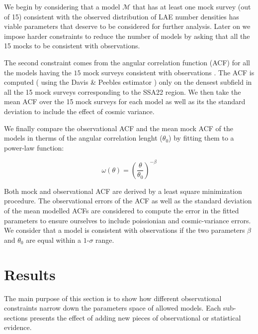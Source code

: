 \documentclass[usenatbib]{mn2e}
\begin{document}
We begin by considering that  a model ${\mathcal M}$ that has at least
one mock survey (out of 15) consistent with the observed
distribution of LAE number densities has viable parameters that
deserve to be considered for further analysis. Later on we impose
harder constraints to reduce the number of models by asking that all
the 15 mocks to be consistent with observations.

The second constraint  comes from the angular correlation function (ACF)
for all the models having the $15$ mock surveys consistent with
observations . The ACF is computed  ( using 
the Davis \& Peebles  estimator \citep{Davis1983} ) only on the densest
subfield in all the 15 mock surveys corresponding to the SSA22
region. We then take the mean ACF over the 15  mock surveys  for
each model as well as its the standard deviation to include
the effect of cosmic variance. 

We finally compare the observational ACF and the mean mock  ACF of the models   
in therms of the angular correlation lenght ($\theta_{0}$) by fitting 
them to a power-law function:  

\begin{equation}
\omega(\theta) = \left(\frac{\theta}{\theta_{0}}\right)^{-\beta}
\label{eq:fitting}
\end{equation}

Both mock and observational ACF are derived by a least
square minimization procedure. The observational errors of 
the ACF as well as the standard deviation of the mean modelled ACFs  are
considered to compute the error in the fitted parameters to ensure ourselves
to include poissionian and cosmic-variance errors. 
We consider that a model is consistent with observations if the two
parameters $\beta$ and $\theta_0$ are equal within a $1$-$\sigma$ range. 



 
\section{Results}
\label{sec:results}

The main purpose of this section is to show how different
observational constraints narrow down the parameters space of allowed
models. Each sub-sections presents the effect of adding new pieces of
observational or statistical evidence. 
\end{document}
